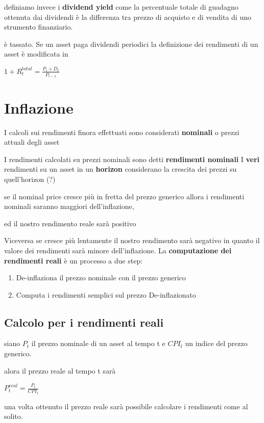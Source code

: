 \documentclass[a4paper,11pt]{report}
\begin{document}
{	definiamo invece i \textbf{dividend yield} come la percentuale totale di guadagno ottenuta dai dividendi
	è la differenza tra prezzo di acquisto e di vendita di uno strumento finanziario.

	è tassato. \newline
	Se un asset paga dividendi periodici la definizione dei rendimenti di un asset è modificata in
\begin{center}
	$1+R_t^{total}= {\frac {P_t + D_t}{P_{t-1}}} $
\end{center}

\section{Inflazione}
	I calcoli sui rendimenti finora effettuati sono considerati \textbf{nominali} o prezzi attuali degli asset

	I rendimenti calcolati su prezzi nominali sono detti \textbf{rendimenti nominali} \newline
	I \textbf{veri} rendimenti su un asset in un \textbf{horizon} considerano la crescita dei prezzi su quell'horizon (?)
	
	se il nominal price cresce più in fretta del prezzo generico allora i rendimenti nominali saranno maggiori dell'inflazione,
	
	 ed il nostro rendimento reale sarà positivo

	Viceversa se cresce più lentamente il nostro rendimento sarà negativo in quanto il valore dei rendimenti sarà minore dell'inflazione. 		\newline
	La \textbf{computazione dei rendimenti reali} è un processo a due step:
\begin{enumerate}
	\item De-inflaziona il prezzo nominale con il prezzo generico
	\item Computa i rendimenti semplici sul prezzo De-inflazionato
\end{enumerate}
\subsection{Calcolo per i rendimenti reali}
	siano $P_t$ il prezzo nominale di un asset al tempo t e $CPI_t$ un indice del prezzo generico.
	
	alora il prezzo reale al tempo t sarà
\begin{center}
	$P_t^{real} = {\frac {P_t}{CPI_t}}$	
\end{center}
	una volta ottenuto il prezzo reale sarà possibile calcolare i rendimenti come al solito. 
}
\end{document}
